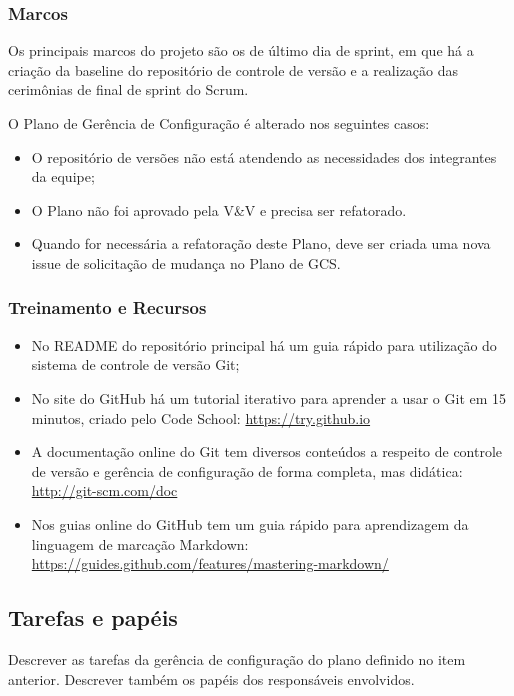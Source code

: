 \subsubsection{Marcos}

Os principais marcos do projeto são os de último dia de sprint, em que há a criação da baseline do repositório de controle de versão e a realização das cerimônias de final de sprint do Scrum. 

O Plano de Gerência de Configuração é alterado nos seguintes casos:

\begin{itemize}
\item O repositório de versões não está atendendo as necessidades dos integrantes da equipe;
\item O Plano não foi aprovado pela V\&V e precisa ser refatorado.
\item Quando for necessária a refatoração deste Plano, deve ser criada uma nova issue de solicitação de mudança no Plano de GCS.
\end{itemize}

\subsubsection{Treinamento e Recursos}

\begin{itemize}
\item No README do repositório principal há um guia rápido para utilização do sistema de controle de versão Git;
\item No site do GitHub há um tutorial iterativo para aprender a usar o Git em 15 minutos, criado pelo Code School: \url{https://try.github.io}
\item A documentação online do Git tem diversos conteúdos a respeito de controle de versão e gerência de configuração de forma completa, mas didática: \url{http://git-scm.com/doc}
\item Nos guias online do GitHub tem um guia rápido para aprendizagem da linguagem de marcação Markdown: \url{https://guides.github.com/features/mastering-markdown/}
\end{itemize}


\subsection{Tarefas e papéis}

Descrever as tarefas da gerência de configuração do plano
definido no item anterior. Descrever também os papéis dos
responsáveis envolvidos.

